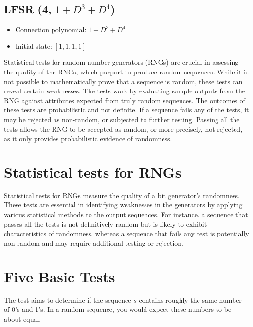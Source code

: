 \documentclass[12pt,openany]{book}
\theoremstyle{definition}
\begin{document}
\subsection*{LFSR (4, \( 1 + D^3 + D^4 \))}
\begin{itemize}
	\item Connection polynomial: \( 1 + D^3 + D^4 \)
	\item Initial state: \( [1, 1, 1, 1] \)
\end{itemize}


\newpage
Statistical tests for random number generators (RNGs) are crucial in assessing the quality of the RNGs, which purport to produce random sequences. While it is not possible to mathematically prove that a sequence is random, these tests can reveal certain weaknesses. The tests work by evaluating sample outputs from the RNG against attributes expected from truly random sequences. The outcomes of these tests are probabilistic and not definite. If a sequence fails any of the tests, it may be rejected as non-random, or subjected to further testing. Passing all the tests allows the RNG to be accepted as random, or more precisely, not rejected, as it only provides probabilistic evidence of randomness.

\section{Statistical tests for RNGs}
Statistical tests for RNGs measure the quality of a bit generator's randomness. These tests are essential in identifying weaknesses in the generators by applying various statistical methods to the output sequences. For instance, a sequence that passes all the tests is not definitively random but is likely to exhibit characteristics of randomness, whereas a sequence that fails any test is potentially non-random and may require additional testing or rejection.

\newpage
\section{Five Basic Tests}
The test aims to determine if the sequence 
$s$ contains roughly the same number of 0's and 1's. In a random sequence, you would expect these numbers to be about equal.
\end{document}
